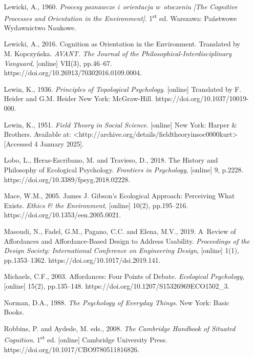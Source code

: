 Lewicki, A., 1960. \textit{Procesy poznawcze i~orientacja w~otoczeniu [The Cognitive Processes and Orientation in the Environment]}. 1\textsuperscript{st} ed. Warszawa: Państwowe Wydawnictwo Naukowe.



Lewicki, A., 2016. Cognition as Orientation in the Environment. Translated by M. Kopczyńska. \textit{AVANT. The Journal of the Philosophical-Interdisciplinary Vanguard}, [online] VII(3), pp.46–67. https://doi.org/10.26913/70302016.0109.0004.



Lewin, K., 1936. \textit{Principles of Topological Psychology}. [online] Translated by F. Heider and G.M. Heider New York: McGraw-Hill. https://doi.org/10.1037/10019-000.



Lewin, K., 1951. \textit{Field Theory in Social Science}. [online] New York: Harper \& Brothers. Available at: {\textless}http://archive.org/details/fieldtheoryinsoc0000kurt{\textgreater} [Accessed 4 January 2025].



Lobo, L., Heras-Escribano, M. and Travieso, D., 2018. The History and Philosophy of Ecological Psychology. \textit{Frontiers in Psychology}, [online] 9, p.2228. https://doi.org/10.3389/fpsyg.2018.02228.



Mace, W.M., 2005. James J. Gibson's Ecological Approach: Perceiving What Exists. \textit{Ethics \& the Environment}, [online] 10(2), pp.195–216. https://doi.org/10.1353/een.2005.0021.



Masoudi, N., Fadel, G.M., Pagano, C.C. and Elena, M.V., 2019. A~Review of Affordances and Affordance-Based Design to Address Usability. \textit{Proceedings of the Design Society: International Conference on Engineering Design}, [online] 1(1), pp.1353–1362. https://doi.org/10.1017/dsi.2019.141.



Michaels, C.F., 2003. Affordances: Four Points of Debate. \textit{Ecological Psychology}, [online] 15(2), pp.135–148. https://doi.org/10.1207/S15326969ECO1502\_3.



Norman, D.A., 1988. \textit{The Psychology of Everyday Things}. New York: Basic Books.



Robbins, P. and Aydede, M. eds., 2008. \textit{The Cambridge Handbook of Situated Cognition}. 1\textsuperscript{st} ed. [online] Cambridge University Press. https://doi.org/10.1017/CBO9780511816826.



